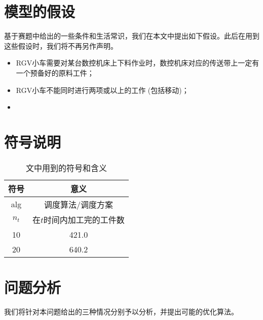 \documentclass{cumcmthesis}
\begin{document}
\section{模型的假设}
基于赛题中给出的一些条件和生活常识，我们在本文中提出如下假设。此后在用到这些假设时，我们将不再另作声明。
\begin{itemize}
\item RGV小车需要对某台数控机床上下料作业时，数控机床对应的传送带上一定有一个预备好的原料工件；
\item RGV小车不能同时进行两项或以上的工作 (包括移动)；
\item 
\end{itemize}


\section{符号说明}
\begin{table}[!htbp]
    \centering
    \begin{tabular}{cc}
    \toprule[1.5pt]
    符号 & 意义\\
    \midrule[1pt]
    alg     & 调度算法/调度方案 \\
    \(n_t\) & 在$t$时间内加工完的工件数  \\
    10 & 421.0 \\
    20 & 640.2 \\
    \bottomrule[1.5pt]
    \end{tabular}
    \caption{文中用到的符号和含义}\label{fuHaoShuoMing}
\end{table}

\section{问题分析}
我们将针对本问题给出的三种情况分别予以分析，并提出可能的优化算法。
\end{document}
